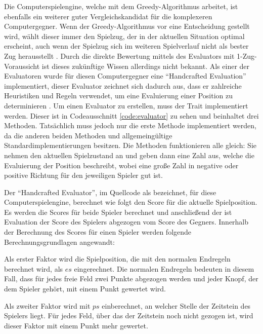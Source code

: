 Die Computerspielengine, welche mit dem Greedy-Algorithmus arbeitet, ist ebenfalls ein weiterer guter Vergleichskandidat für die komplexeren Computergegner. Wenn der Greedy-Algorithmus vor eine Entscheidung gestellt wird, wählt dieser immer den Spielzug, der in der aktuellen Situation optimal erscheint, auch wenn der Spielzug sich im weiteren Spielverlauf nicht als bester Zug herausstellt \cite[S. 234]{2023Greedy}. Durch die direkte Bewertung mittels des Evaluators mit 1-Zug-Voraussicht ist dieses zukünftige Wissen allerdings nicht bekannt. Als einer der Evaluatoren wurde für diesen Computergegner eine \enquote{Handcrafted Evaluation} implementiert, dieser Evaluator zeichnet sich dadurch aus, dass er zahlreiche Heuristiken und Regeln verwendet, um eine Evaluierung einer Position zu determinieren \cite{2023.StockfishTerminology}. Um einen Evaluator zu erstellen, muss der Trait  implementiert werden. Dieser ist in Codeausschnitt \ref{code:evaluator} zu sehen und beinhaltet drei Methoden. Tatsächlich muss jedoch nur die erste Methode  implementiert werden, da die anderen beiden Methoden  und  allgemeingültige Standardimplementierungen besitzen. Die Methoden funktionieren alle gleich: Sie nehmen den aktuellen Spielzustand an und geben dann eine Zahl aus, welche die Evaluierung der Position beschreibt, wobei eine große Zahl in negative oder positive Richtung für den jeweiligen Spieler gut ist.



Der \enquote{Handcrafted Evaluator}, im Quellcode als  bezeichnet, für diese Computerspielengine, berechnet wie folgt den Score für die aktuelle Spielposition. Es werden die Scores für beide Spieler berechnet und anschließend der ist Evaluation der Score des Spielers abgezogen vom Score des Gegners. Innerhalb der Berechnung des Scores für einen Spieler werden folgende Berechnungsgrundlagen angewandt:

Als erster Faktor wird die Spielposition, die mit den normalen Endregeln berechnet wird, als $es$ eingerechnet. Die normalen Endregeln bedeuten in diesem Fall, dass für jedes freie Feld zwei Punkte abgezogen werden und jeder Knopf, der dem Spieler gehört, mit einem Punkt gewertet wird.

Als zweiter Faktor wird mit $ps$ einberechnet, an welcher Stelle der Zeitstein des Spielers liegt. Für jedes Feld, über das der Zeitstein noch nicht gezogen ist, wird dieser Faktor mit einem Punkt mehr gewertet.


